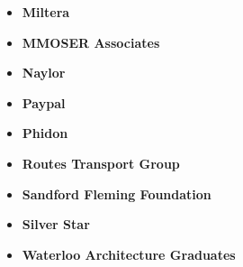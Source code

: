 \documentclass[main.tex]{subfiles}
\begin{document}
\begin{flushleft}
\begin{multicols}{3}
\begin{itemize}[label={},noitemsep]
    \item \textbf{Miltera}
    \end{itemize}
    \columnbreak
    \begin{itemize}[label={},noitemsep]
    \item \textbf{MMOSER Associates}
    \end{itemize}
    \columnbreak
    \begin{itemize}[label={},noitemsep]
    \item \textbf{Naylor}
    \end{itemize}
    \columnbreak
\end{multicols}

\begin{multicols}{3}
\begin{itemize}[label={},noitemsep]
    \item \textbf{Paypal}
    \end{itemize}
    \columnbreak
    \begin{itemize}[label={},noitemsep]
    \item \textbf{Phidon}
    \end{itemize}
    \columnbreak
    \begin{itemize}[label={},noitemsep]
    \item \textbf{Routes Transport Group}
    \end{itemize}
    \columnbreak
\end{multicols}

\begin{multicols}{3}
\begin{itemize}[label={},noitemsep]
    \item \textbf{Sandford Fleming Foundation}
    \end{itemize}
    \columnbreak
    \begin{itemize}[label={},noitemsep]
    \item \textbf{Silver Star}
    \end{itemize}
    \columnbreak
    \begin{itemize}[label={},noitemsep]
    \item \textbf{Waterloo Architecture Graduates}
    \end{itemize}
    \columnbreak
\end{multicols}


\end{flushleft}
\end{document}
